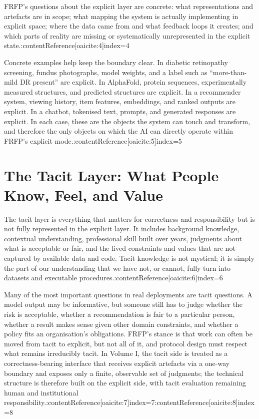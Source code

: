 FRFP’s questions about the explicit layer are concrete: what representations and artefacts are in scope; what mapping the system is actually implementing in explicit space; where the data came from and what feedback loops it creates; and which parts of reality are missing or systematically unrepresented in the explicit state.:contentReference[oaicite:4]{index=4}

Concrete examples help keep the boundary clear. In diabetic retinopathy screening, fundus photographs, model weights, and a label such as ``more-than-mild DR present'' are explicit. In AlphaFold, protein sequences, experimentally measured structures, and predicted structures are explicit. In a recommender system, viewing history, item features, embeddings, and ranked outputs are explicit. In a chatbot, tokenised text, prompts, and generated responses are explicit. In each case, these are the objects the system can touch and transform, and therefore the only objects on which the AI can directly operate within FRFP’s explicit mode.:contentReference[oaicite:5]{index=5}

\section{The Tacit Layer: What People Know, Feel, and Value}

The tacit layer is everything that matters for correctness and responsibility but is not fully represented in the explicit layer. It includes background knowledge, contextual understanding, professional skill built over years, judgments about what is acceptable or fair, and the lived constraints and values that are not captured by available data and code. Tacit knowledge is not mystical; it is simply the part of our understanding that we have not, or cannot, fully turn into datasets and executable procedures.:contentReference[oaicite:6]{index=6}

Many of the most important questions in real deployments are tacit questions. A model output may be informative, but someone still has to judge whether the risk is acceptable, whether a recommendation is fair to a particular person, whether a result makes sense given other domain constraints, and whether a policy fits an organisation’s obligations. FRFP’s stance is that work can often be moved from tacit to explicit, but not all of it, and protocol design must respect what remains irreducibly tacit. In Volume I, the tacit side is treated as a correctness-bearing interface that receives explicit artefacts via a one-way boundary and exposes only a finite, observable set of judgments; the technical structure is therefore built on the explicit side, with tacit evaluation remaining human and institutional responsibility.:contentReference[oaicite:7]{index=7}:contentReference[oaicite:8]{index=8}

